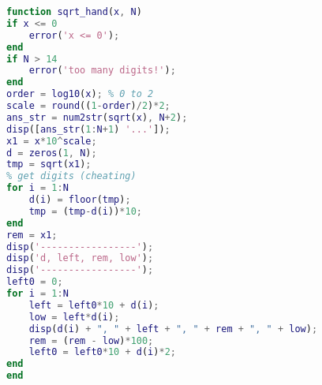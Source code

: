 \begin{lstlisting}[language=matlab]
function sqrt_hand(x, N)
if x <= 0
    error('x <= 0');
end
if N > 14
    error('too many digits!');
end
order = log10(x); % 0 to 2
scale = round((1-order)/2)*2;
ans_str = num2str(sqrt(x), N+2);
disp([ans_str(1:N+1) '...']);
x1 = x*10^scale;
d = zeros(1, N);
tmp = sqrt(x1);
% get digits (cheating)
for i = 1:N
    d(i) = floor(tmp);
    tmp = (tmp-d(i))*10;
end
rem = x1;
disp('-----------------');
disp('d, left, rem, low');
disp('-----------------');
left0 = 0;
for i = 1:N
    left = left0*10 + d(i);
    low = left*d(i);
    disp(d(i) + ", " + left + ", " + rem + ", " + low);
    rem = (rem - low)*100;
    left0 = left0*10 + d(i)*2;
end
end
\end{lstlisting}

